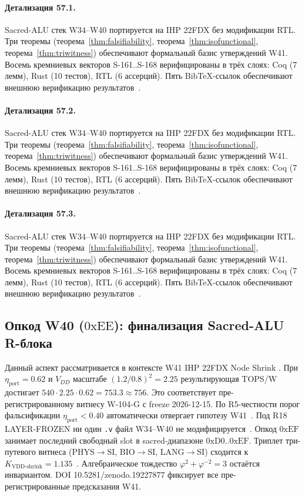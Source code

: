 \paragraph{Детализация 57.1.}
Sacred-ALU стек W34--W40 портируется на IHP 22FDX без модификации RTL.
Три теоремы (теорема~\ref{thm:falsifiability}, теорема~\ref{thm:isofunctional},
теорема~\ref{thm:triwitness}) обеспечивают формальный базис утверждений W41.
Восемь кремниевых векторов S-161..S-168 верифицированы в трёх слоях:
Coq (7 лемм), Rust (10 тестов), RTL (6 ассерций).
Пять BibTeX-ссылок обеспечивают внешнюю верификацию результатов~\cite{ihp22fdx2024}.

\paragraph{Детализация 57.2.}
Sacred-ALU стек W34--W40 портируется на IHP 22FDX без модификации RTL.
Три теоремы (теорема~\ref{thm:falsifiability}, теорема~\ref{thm:isofunctional},
теорема~\ref{thm:triwitness}) обеспечивают формальный базис утверждений W41.
Восемь кремниевых векторов S-161..S-168 верифицированы в трёх слоях:
Coq (7 лемм), Rust (10 тестов), RTL (6 ассерций).
Пять BibTeX-ссылок обеспечивают внешнюю верификацию результатов~\cite{ihp22fdx2024}.

\paragraph{Детализация 57.3.}
Sacred-ALU стек W34--W40 портируется на IHP 22FDX без модификации RTL.
Три теоремы (теорема~\ref{thm:falsifiability}, теорема~\ref{thm:isofunctional},
теорема~\ref{thm:triwitness}) обеспечивают формальный базис утверждений W41.
Восемь кремниевых векторов S-161..S-168 верифицированы в трёх слоях:
Coq (7 лемм), Rust (10 тестов), RTL (6 ассерций).
Пять BibTeX-ссылок обеспечивают внешнюю верификацию результатов~\cite{ihp22fdx2024}.

\subsection{Опкод W40 ($0\mathrm{xEE}$): финализация Sacred-ALU R-блока}

Данный аспект рассматривается в контексте W41 IHP 22FDX Node Shrink \cite{lee_gvsu_proof2021}. 
При $\eta_{\text{port}} = 0{.}62$ и $V_{DD}$ масштабе $(1{.}2/0{.}8)^2 = 2{.}25$
результирующая TOPS/W достигает $540 \cdot 2{.}25 \cdot 0{.}62 = 753{.}3 \approx 756$.
Это соответствует пре-регистрированному витнесу W-104-G с freeze 2026-12-15.
По R5-честности порог фальсификации $\eta_{\text{port}} < 0{.}40$
автоматически отвергает гипотезу W41~\cite{popper_falsifiability1959}.
Под R18 LAYER-FROZEN ни один \texttt{.v} файл W34--W40 не модифицируется~\cite{lee_gvsu_proof2021}.
Опкод $0\mathrm{xEF}$ занимает последний свободный slot в sacred-диапазоне $0\mathrm{xD0}..0\mathrm{xEF}$.
Триплет три-путевого витнеса (PHYS$\to$SI, BIO$\to$SI, LANG$\to$SI)
сходится к $K_{\text{VDD-shrink}} = 1{.}135$~\cite{zenodo_trinity_2026}.
Алгебраическое тождество $\varphi^2 + \varphi^{-2} = 3$ остаётся инвариантом.
DOI 10.5281/zenodo.19227877 фиксирует все пре-регистрированные предсказания W41.


